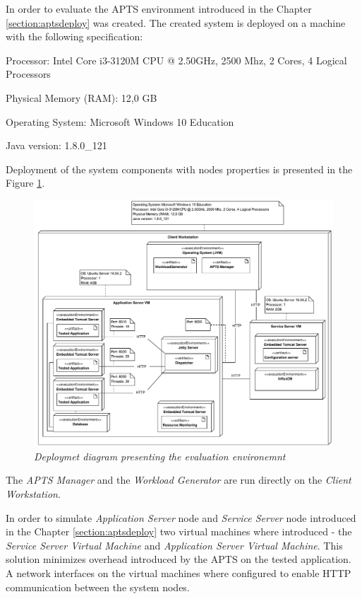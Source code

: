 \documentclass[12pt,a4paper]{article}
\let\tempone\itemize
\let\temptwo\enditemize
\renewenvironment{itemize}{\tempone\addtolength{\itemsep}{-0.4\baselineskip}}{\temptwo}
\begin{document}
In order to evaluate the APTS environment introduced in the Chapter \ref{section:aptsdeploy} was created.
The created system is deployed on a machine with the following specification:
\begin{itemize}
\item Processor: Intel Core i3-3120M CPU @ 2.50GHz, 2500 Mhz, 2 Cores, 4 Logical Processors
\item Physical Memory (RAM): 12,0 GB
\item Operating System: Microsoft Windows 10 Education
\item Java version: 1.8.0\_121
\end{itemize}

Deployment of the system components with nodes properties is presented in the Figure \ref{figure:deployment:evaluation}. 

\begin{figure}[!htb]
\centering
\includegraphics[width=1\textwidth]{ExperimentsEnvironemtDiagram}
\caption{\textit{Deploymet diagram presenting the evaluation environemnt}} \label{figure:deployment:evaluation}
\end{figure}

The \textit{APTS Manager} and the \textit{Workload Generator} are run directly on the \textit{Client Workstation}. 

In order to simulate \textit{Application Server} node and \textit{Service Server} node introduced in the Chapter \ref{section:aptsdeploy} two virtual machines where introduced - the \textit{Service Server Virtual Machine} and \textit{Application Server Virtual Machine}. This solution minimizes overhead introduced by the APTS on the tested application. A network interfaces on the virtual machines where configured to enable HTTP communication between the system nodes. 
\end{document}

